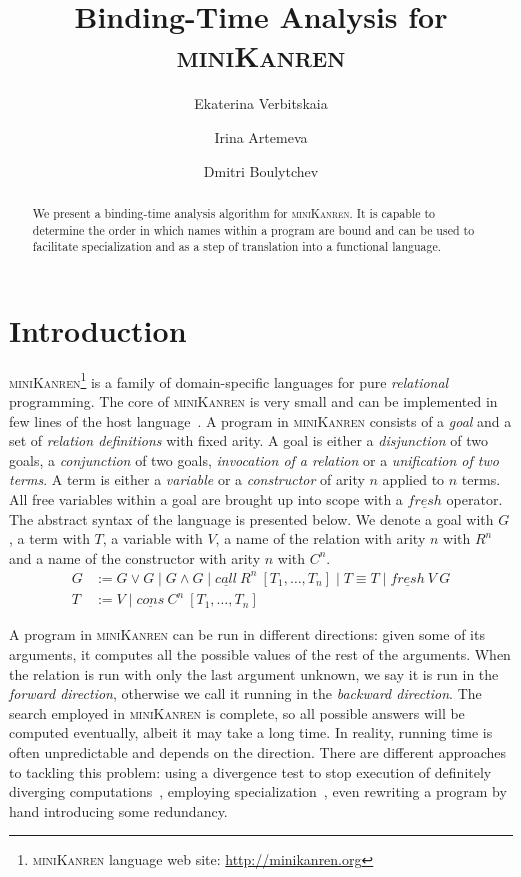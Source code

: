 \documentclass[submission,copyright,creativecommons]{eptcs}
\title{Binding-Time Analysis for \textsc{miniKanren}}
\author{Ekaterina Verbitskaia
\institute{JetBrains Research\\
Saint Petersburg, Russia}
\email{kajigor@gmail.com}
\and
Irina Artemeva
\institute{IFMO University\\
Saint Petersburg, Russia}
\email{irina-pluralia@rambler.ru}
\and
Dmitri Boulytchev
\institute{SPbSU\\
Saint Petersburg, Russia}
\email{dboulytchev@gmail.com}
}
\newcommand{\miniKanren}{\textsc{miniKanren}}
\begin{document}
\maketitle

\begin{abstract}
We present a binding-time analysis algorithm for \miniKanren{}.
It is capable to determine the order in which names within a program are bound and can be used to facilitate specialization and as a step of translation into a functional language.
\end{abstract}

\section{Introduction}

\miniKanren{}\footnote{\miniKanren{} language web site: \url{http://minikanren.org}} is a family of domain-specific languages for pure \emph{relational} programming.
The core of \miniKanren{} is very small and can be implemented in few lines of the host language~\cite{hemann2013ukanren}.
A program in \miniKanren{} consists of a \emph{goal} and a set of \emph{relation definitions} with fixed arity.
A goal is either a \emph{disjunction} of two goals, a \emph{conjunction} of two goals, \emph{invocation of a relation} or a \emph{unification of two terms}.
A term is either a \emph{variable} or a \emph{constructor} of arity $n$ applied to $n$ terms.
All free variables within a goal are brought up into scope with a $\underline{fresh}$ operator.
The abstract syntax of the language is presented below.
We denote a goal with $G$, a term with $T$, a variable with $V$, a name of the relation with arity $n$ with $R^n$ and a name of the constructor with arity $n$ with $C^n$.
\begin{align*}
  G &:= G \vee G \mid G \wedge G \mid \underline{call} \ R^n \ [T_1, \dots, T_n] \mid T \equiv T \mid \underline{fresh} \ V \ G  \\
  T &:= V \mid \underline{cons} \ C^n \  [T_1, \dots, T_n]
\end{align*}

A program in \miniKanren{} can be run in different directions: given some of its arguments, it computes all the possible values of the rest of the arguments.
When the relation is run with only the last argument unknown, we say it is run in the \emph{forward direction}, otherwise we call it running in the \emph{backward direction}.
The search employed in \miniKanren{} is complete, so all possible answers will be computed eventually, albeit it may take a long time.
In reality, running time is often unpredictable and depends on the direction.
There are different approaches to tackling this problem: using a divergence test to stop execution of definitely diverging computations~\cite{rozplokhas2018improving}, employing specialization~\cite{lozov2019relational}, even rewriting a program by hand introducing some redundancy. %
\end{document}

